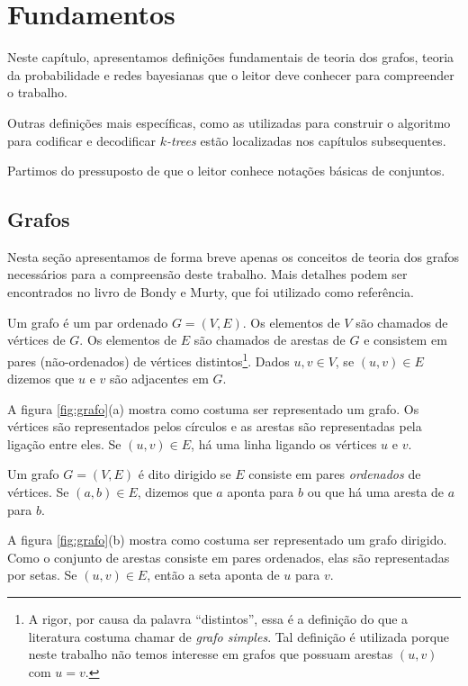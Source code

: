 \chapter{Fundamentos}
\label{cap:fundamentos}

Neste capítulo, apresentamos definições fundamentais de teoria dos grafos, teoria da probabilidade e redes bayesianas que o leitor deve conhecer para compreender o trabalho.

Outras definições mais específicas, como as utilizadas para construir o algoritmo para codificar e decodificar \emph{$k$-trees} estão localizadas nos capítulos subsequentes.

Partimos do pressuposto de que o leitor conhece notações básicas de conjuntos.

\section{Grafos}

Nesta seção apresentamos de forma breve apenas os conceitos de teoria dos grafos necessários para a compreensão deste trabalho. Mais detalhes podem ser encontrados no livro de Bondy e Murty\cite{bondy}, que foi utilizado como referência.

\begin{definition}[grafo]
  Um grafo é um par ordenado $G = (V, E)$. Os elementos de $V$ são chamados de vértices de $G$. Os elementos de $E$ são chamados de arestas de $G$ e consistem em pares (não-ordenados) de vértices distintos\footnote{A rigor, por causa da palavra ``distintos'', essa é a definição do que a literatura costuma chamar de \emph{grafo simples}. Tal definição é utilizada porque neste trabalho não temos interesse em grafos que possuam arestas $(u, v)$ com $u=v$.}. Dados $u, v \in V$, se $(u, v) \in E$ dizemos que $u$ e $v$ são adjacentes em $G$.

  A figura \ref{fig:grafo}(a) mostra como costuma ser representado um grafo. Os vértices são representados pelos círculos e as arestas são representadas pela ligação entre eles. Se $(u, v) \in E$, há uma linha ligando os vértices $u$ e $v$.
\end{definition}

\begin{definition}
  Um grafo $G = (V, E)$ é dito dirigido se $E$ consiste em pares \emph{ordenados} de vértices. Se $(a, b) \in E$, dizemos que $a$ aponta para $b$ ou que há uma aresta de $a$ para $b$.

  A figura \ref{fig:grafo}(b) mostra como costuma ser representado um grafo dirigido. Como o conjunto de arestas consiste em pares ordenados, elas são representadas por setas. Se $(u, v) \in E$, então a seta aponta de $u$ para $v$.
\end{definition}

